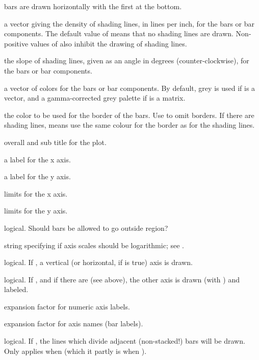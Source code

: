 \begin{Arguments}
\begin{ldescription}
bars are drawn horizontally with the first at the bottom.
\item[\code{density}] a vector giving the density of shading lines, in
lines per inch, for the bars or bar components.
The default value of  means that no shading lines
are drawn. Non-positive values of  also inhibit the
drawing of shading lines.
\item[\code{angle}] the slope of shading lines, given as an angle in
degrees (counter-clockwise), for the bars or bar components.
\item[\code{col}] a vector of colors for the bars or bar components.
By default, grey is used if  is a vector, and a
gamma-corrected grey palette if  is a matrix.
\item[\code{border}] the color to be used for the border of the bars.
Use  to omit borders.  If there are shading
lines,  means use the same colour for
the border as for the shading lines.
\item[\code{main,sub}] overall and sub title for the plot.
\item[\code{xlab}] a label for the x axis.
\item[\code{ylab}] a label for the y axis.
\item[\code{xlim}] limits for the x axis.
\item[\code{ylim}] limits for the y axis.
\item[\code{xpd}] logical. Should bars be allowed to go outside region?
\item[\code{log}] string specifying if axis scales should be logarithmic; see
.
\item[\code{axes}] logical.  If , a vertical (or horizontal, if
 is true) axis is drawn.
\item[\code{axisnames}] logical.  If , and if there are
 (see above), the
other axis is drawn (with ) and labeled.
\item[\code{cex.axis}] expansion factor for numeric axis labels.
\item[\code{cex.names}] expansion factor for axis names (bar labels).
\item[\code{inside}] logical.  If , the lines which divide
adjacent (non-stacked!) bars will be drawn.  Only applies when
 (which it partly is when ).



\end{ldescription}
\end{Arguments}
